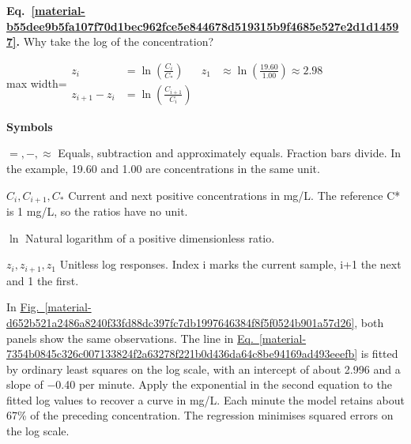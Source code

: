\documentclass[11pt,a4paper]{article}
\begin{document}
\par\medskip
\noindent\begin{minipage}{\linewidth}
\label{material-b55dee9b5fa107f70d1bec962fce5e844678d519315b9f4685e527e2d1d14597}
\noindent\textbf{Eq.~\ref*{material-b55dee9b5fa107f70d1bec962fce5e844678d519315b9f4685e527e2d1d14597}.} Why take the log of the concentration?\par\nopagebreak
\begin{center}\begin{adjustbox}{max width=\linewidth}$\displaystyle \begin{aligned} z_i &= \ln\!\left(\frac{C_i}{C_*}\right) & z_1 &\approx \ln\!\left(\frac{19.60}{1.00}\right) \approx 2.98 \\[.65em] z_{i+1}-z_i &= \ln\!\left(\frac{C_{i+1}}{C_i}\right) && \end{aligned}$\end{adjustbox}\end{center}

\par\noindent\textbf{Symbols}

\par\noindent\textbf{\(=,-,\approx\)} Equals, subtraction and approximately equals. Fraction bars divide. In the example, 19.60 and 1.00 are concentrations in the same unit.

\par\noindent\textbf{\(C_i,C_{i+1},C_*\)} Current and next positive concentrations in mg/L. The reference C* is 1 mg/L, so the ratios have no unit.

\par\noindent\textbf{\(\ln\)} Natural logarithm of a positive dimensionless ratio.

\par\noindent\textbf{\(z_i,z_{i+1},z_1\)} Unitless log responses. Index i marks the current sample, i+1 the next and 1 the first.

\end{minipage}\par
\medskip

In \hyperref[material-d652b521a2486a8240f33fd88dc397fc7db1997646384f8f5f0524b901a57d26]{Fig.~\ref*{material-d652b521a2486a8240f33fd88dc397fc7db1997646384f8f5f0524b901a57d26}}, both panels show the same observations. The line in \hyperref[material-7354b0845c326c007133824f2a63278f221b0d436da64c8be94169ad493eeefb]{Eq.~\ref*{material-7354b0845c326c007133824f2a63278f221b0d436da64c8be94169ad493eeefb}} is fitted by ordinary least squares on the log scale, with an intercept of about 2.996 and a slope of \ensuremath{-}0.40 per minute. Apply the exponential in the second equation to the fitted log values to recover a curve in mg/L. Each minute the model retains about 67\% of the preceding concentration. The regression minimises squared errors on the log scale.
\end{document}
